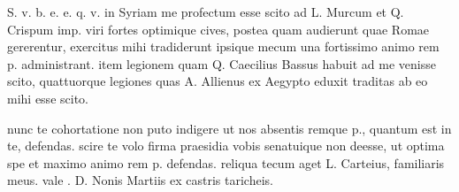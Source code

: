 


 S. v. b. e. e. q. v. in Syriam me profectum esse scito ad L. Murcum et Q. Crispum imp. viri fortes optimique cives, postea quam audierunt quae Romae gererentur, exercitus mihi tradiderunt ipsique mecum una fortissimo animo rem p. administrant. item legionem quam Q. Caecilius Bassus habuit ad me venisse scito, quattuorque legiones quas A. Allienus ex Aegypto eduxit traditas ab eo mihi esse scito.

 nunc te cohortatione non puto indigere ut nos absentis remque p., quantum est in te, defendas. scire te volo firma praesidia vobis senatuique non deesse, ut optima spe et maximo animo rem p. defendas. reliqua tecum aget L. Carteius, familiaris meus. vale . D. Nonis Martiis ex castris taricheis.
